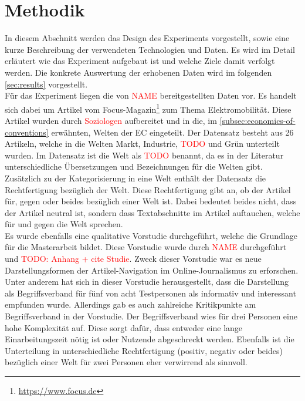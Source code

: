 \section{Methodik}
In diesem Abschnitt werden das Design des Experiments vorgestellt, sowie eine kurze Beschreibung der verwendeten Technologien und Daten.
Es wird im Detail erläutert wie das Experiment aufgebaut ist und welche Ziele damit verfolgt werden.
Die konkrete Auswertung der erhobenen Daten wird im folgenden \autoref{sec:results} vorgestellt.\\

Für das Experiment liegen die von \textcolor{red}{NAME} bereitgestellten Daten vor.
Es handelt sich dabei um Artikel vom Focus-Magazin\footnote{\url{https://www.focus.de}} zum Thema Elektromobilität.
Diese Artikel wurden durch \textcolor{red}{Soziologen} aufbereitet und in die, im \autoref{subsec:economics-of-conventions} erwähnten, Welten der \ac{EC} eingeteilt.
Der Datensatz besteht aus 26 Artikeln, welche in die Welten Markt, Industrie, \textcolor{red}{TODO} und Grün unterteilt wurden.
Im Datensatz ist die Welt als \textcolor{red}{TODO} benannt, da es in der Literatur unterschiedliche Übersetzungen und Bezeichnungen für die Welten gibt.
Zusätzlich zu der Kategorisierung in eine Welt enthält der Datensatz die Rechtfertigung bezüglich der Welt.
Diese Rechtfertigung gibt an, ob der Artikel für, gegen oder beides bezüglich einer Welt ist.
Dabei bedeutet beides nicht, dass der Artikel neutral ist, sondern dass Textabschnitte im Artikel auftauchen, welche für und gegen die Welt sprechen.\\

Es wurde ebenfalls eine qualitative Vorstudie durchgeführt, welche die Grundlage für die Masterarbeit bildet.
Diese Vorstudie wurde durch \textcolor{red}{NAME} durchgeführt und \textcolor{red}{TODO: Anhang + cite Studie}.
Zweck dieser Vorstudie war es neue Darstellungsformen der Artikel-Navigation im Online-Journalismus zu erforschen.
Unter anderem hat sich in dieser Vorstudie herausgestellt, dass die Darstellung als Begriffsverband für fünf von acht Testpersonen als informativ und interessant empfunden wurde.
Allerdings gab es auch zahlreiche Kritikpunkte am Begriffsverband in der Vorstudie.
Der Begriffsverband wies für drei Personen eine hohe Komplexität auf.
Diese sorgt dafür, dass entweder eine lange Einarbeitungszeit nötig ist oder Nutzende abgeschreckt werden.
Ebenfalls ist die Unterteilung in unterschiedliche Rechtfertigung (positiv, negativ oder beides) bezüglich einer Welt für zwei Personen eher verwirrend als sinnvoll.\\

